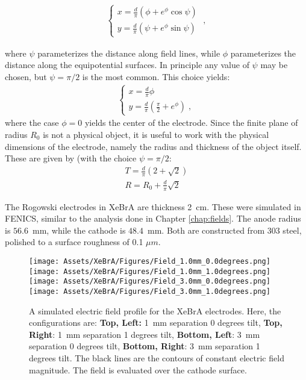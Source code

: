 \begin{align}
\begin{cases}
    x = \frac{d}{\pi} ( \phi + e^\phi \cos \psi)\\
    y = \frac{d}{\pi} ( \psi + e^\phi \sin \psi)
    \end{cases}\;,
\end{align}

where $\psi$ parameterizes the distance along field lines, while $\phi$ parameterizes the distance along the equipotential surfaces.
In principle any value of $\psi$ may be chosen, but $\psi= \pi/2$ is the most common.
This choice yields:
\begin{align}
\begin{cases}
    x = \frac{d}{\pi} \phi\\
    y = \frac{d}{\pi}(\frac{\pi}{2} + e^\phi)\;,
    \end{cases}
\end{align}
where the case $\phi=0$ yields the center of the electrode.
Since the finite plane of radius $R_0$ is not a physical object, it is useful to work with the physical dimensions of the electrode, namely the radius and thickness of the object itself.
These are given by (with the choice $\psi = \pi /2$:
\begin{align}
    T=\frac{d}{\pi}(2 + \sqrt{2})\\
    R=R_0 +\frac{d}{\pi}\sqrt{2}
\end{align}

The Rogowski electrodes in XeBrA are thickness 2~cm.
These were simulated in FENICS, similar to the analysis done in Chapter \ref{chap:fields}.
The anode radius is $56.6$~mm, while the cathode is $48.4$~mm.
Both are constructed from 303 steel, polished to a surface roughness of 0.1 $\mu m$.
\begin{figure} 
    \centering
    \texttt{[image: Assets/XeBrA/Figures/Field\_1.0mm\_0.0degrees.png]}
    \texttt{[image: Assets/XeBrA/Figures/Field\_1.0mm\_1.0degrees.png]}\\
    \texttt{[image: Assets/XeBrA/Figures/Field\_3.0mm\_0.0degrees.png]}
    \texttt{[image: Assets/XeBrA/Figures/Field\_3.0mm\_1.0degrees.png]}
    \caption[A simulated electric field profile for the XeBrA electrodes.]%
    {A simulated electric field profile for the XeBrA electrodes.
    Here, the configurations are: \textbf{Top, Left:} 1~mm separation 0 degrees tilt,
    \textbf{Top, Right}: 1~mm separation 1 degrees tilt,
      \textbf{Bottom, Left}: 3~mm separation 0 degrees tilt,
        \textbf{Bottom, Right}: 3~mm separation 1 degrees tilt.
    The black lines are the contours of constant electric field magnitude.
    The field is evaluated over the cathode surface.}
    \label{fig:field_3mm}
\end{figure}
